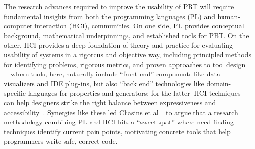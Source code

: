 
The research advances required to improve the usability of PBT
will require fundamental insights from
both the
programming languages (PL) and human-computer interaction (HCI),
communities.
On one side, PL provides conceptual background,
mathematical underpinnings, and established tools for PBT.  On the
other, HCI provides a deep foundation of theory and
practice for evaluating usability of systems in a
rigorous and objective way, including principled methods for
identifying problems, rigorous metrics, and proven
approaches to tool design---where tools, here, naturally include
``front end'' components like
data visualizers and IDE plug-ins, but
also ``back end'' technologies like domain-specific languages for
properties and generators; for the latter, HCI techniques
can help designers
strike the right balance between expressiveness and
accessibility~\cite{coblenz_pliers_2021,greenman_little_2022}.
Synergies like these led
Chasins et al.~\cite{chasins_pl_2021} to argue that a research
methodology combining PL and HCI hits a ``sweet spot'' where
need-finding techniques identify current
pain points, motivating concrete tools that help programmers write
safe, correct code.



